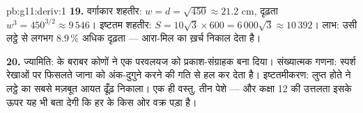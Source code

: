 \begin{solution}{pb:g11:deriv:1}
\textbf{19.} वर्गाकार शहतीर: $w = d = \sqrt{450} \approx 21.2$ cm, दृढ़ता $w^3 = 450^{3/2} \approx 9\,546$। इष्टतम शहतीर: $S = 10\sqrt3 \times 600 = 6\,000\sqrt3 \approx 10\,392$।
लाभ: उसी लट्ठे से लगभग $8.9\,\%$ अधिक दृढ़ता ---  आरा-मिल का ख़र्च निकाल
देता है।

\textbf{20.} ज्यामिति:  के बराबर कोणों ने एक परवलयज को
प्रकाश-संग्राहक बना दिया। संख्यात्मक गणना: स्पर्श रेखाओं पर फिसलते जाना
 को अंक-दुगुने करने की गति से हल कर देता है। इष्टतमीकरण: लुप्त होते
 ने लट्ठे का सबसे मज़बूत आयत ढूँढ़ निकाला। एक ही वस्तु, तीन पेशे ---
और कक्षा 12 की उत्तलता इसके ऊपर यह भी बता देगी कि हर  के किस ओर
वक्र पड़ा है।
\end{solution}
